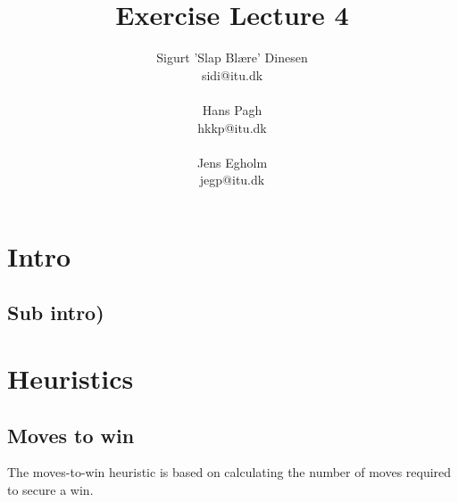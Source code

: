 \documentclass[a4paper, titlepage]{article}
\begin{document}
\title{Exercise Lecture 4}
\author{Sigurt 'Slap Blære' Dinesen \\sidi{@}itu.dk \\\\ Hans Pagh \\hkkp@itu.dk \\\\Jens
Egholm \\jegp@itu.dk}
\maketitle
\tableofcontents
\pagebreak

\section*{Intro}
\subsection*{Sub intro)}

\section*{Heuristics}

\subsection*{Moves to win}
The moves-to-win heuristic is based on calculating the number of moves required to secure a win.
\end{document}
